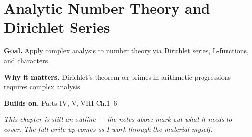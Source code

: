 \chapter{Analytic Number Theory and Dirichlet Series}
\label{ch:08-complex-analysis-and-harmonic-analysis-07}

\begin{chapterintro}
\textbf{Goal.} Apply complex analysis to number theory via Dirichlet series, L-functions, and characters.

\textbf{Why it matters.} Dirichlet's theorem on primes in arithmetic progressions requires complex analysis.

\textbf{Builds on.} Parts IV, V, VIII Ch.1–6
\end{chapterintro}

\textit{This chapter is still an outline --- the notes above mark out what it needs to cover. The full write-up comes as I work through the material myself.}
